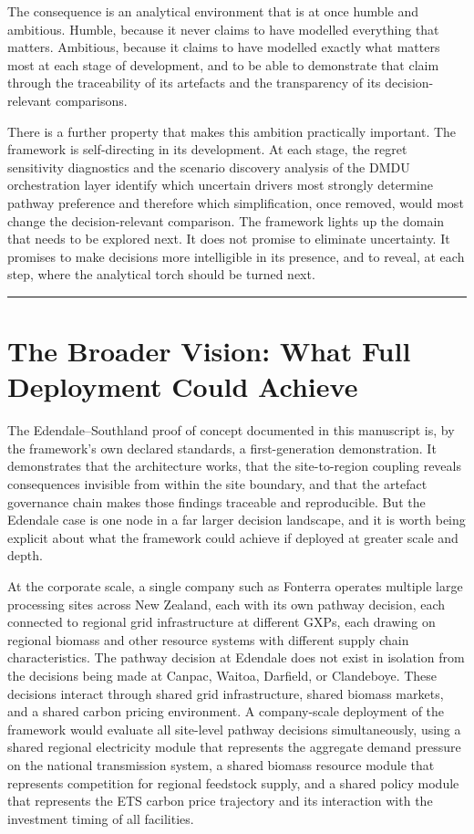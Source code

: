 \documentclass[
  11pt,
  a4paper,
  twoside,
  openright]{scrbook}
\begin{document}
The consequence is an analytical environment that is at once humble and
ambitious. Humble, because it never claims to have modelled everything
that matters. Ambitious, because it claims to have modelled exactly what
matters most at each stage of development, and to be able to demonstrate
that claim through the traceability of its artefacts and the
transparency of its decision-relevant comparisons.

There is a further property that makes this ambition practically
important. The framework is self-directing in its development. At each
stage, the regret sensitivity diagnostics and the scenario discovery
analysis of the DMDU orchestration layer identify which uncertain
drivers most strongly determine pathway preference and therefore which
simplification, once removed, would most change the decision-relevant
comparison. The framework lights up the domain that needs to be explored
next. It does not promise to eliminate uncertainty. It promises to make
decisions more intelligible in its presence, and to reveal, at each
step, where the analytical torch should be turned next.

\begin{center}\rule{0.5\linewidth}{0.5pt}\end{center}

\section{The Broader Vision: What Full Deployment Could
Achieve}\label{the-broader-vision-what-full-deployment-could-achieve}

The Edendale--Southland proof of concept documented in this manuscript
is, by the framework's own declared standards, a first-generation
demonstration. It demonstrates that the architecture works, that the
site-to-region coupling reveals consequences invisible from within the
site boundary, and that the artefact governance chain makes those
findings traceable and reproducible. But the Edendale case is one node
in a far larger decision landscape, and it is worth being explicit about
what the framework could achieve if deployed at greater scale and depth.

At the corporate scale, a single company such as Fonterra operates
multiple large processing sites across New Zealand, each with its own
pathway decision, each connected to regional grid infrastructure at
different GXPs, each drawing on regional biomass and other resource
systems with different supply chain characteristics. The pathway
decision at Edendale does not exist in isolation from the decisions
being made at Canpac, Waitoa, Darfield, or Clandeboye. These decisions
interact through shared grid infrastructure, shared biomass markets, and
a shared carbon pricing environment. A company-scale deployment of the
framework would evaluate all site-level pathway decisions
simultaneously, using a shared regional electricity module that
represents the aggregate demand pressure on the national transmission
system, a shared biomass resource module that represents competition for
regional feedstock supply, and a shared policy module that represents
the ETS carbon price trajectory and its interaction with the investment
timing of all facilities.
\end{document}
